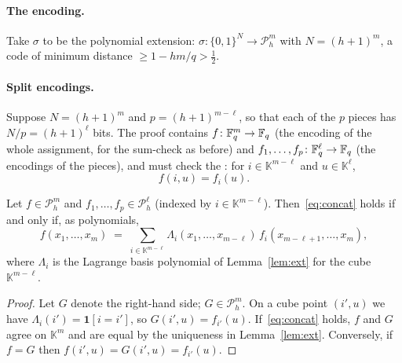 \paragraph{The encoding.}  Take $\sigma$ to be the polynomial extension: $\sigma\colon\{0,1\}^N\to\mathcal P^{m}_h$ with $N=(h+1)^m$, a code of minimum distance $\ge1-hm/q>\tfrac12$.

\paragraph{Split encodings.}  Suppose $N=(h+1)^m$ and $p=(h+1)^{m-\ell}$, so that each of the $p$ pieces has $N/p=(h+1)^\ell$ bits.  The proof contains $f\colon\mathbb{F}_q^m\to\mathbb{F}_q$ (the encoding of the whole assignment, for the sum-check as before)
and $f_1,\dots,f_p\colon\mathbb{F}_q^\ell\to\mathbb{F}_q$ (the encodings of the pieces), and must check the : for $i\in\mathbb K^{m-\ell}$ and $u\in\mathbb K^\ell$,
\begin{equation}\label{eq:concat}
  f(i,u)=f_i(u).
\end{equation}

\begin{lemma}[Concatenation]\label{lem:concat}
Let $f\in\mathcal P^m_h$ and $f_1,\dots,f_p\in\mathcal P^\ell_h$ (indexed by $i\in\mathbb K^{m-\ell}$).  Then~\eqref{eq:concat} holds if and only if, as polynomials,
\[
  f(x_1,\dots,x_m)\;=\;\sum_{i\in\mathbb K^{m-\ell}}\Lambda_i(x_1,\dots,x_{m-\ell})\,f_i(x_{m-\ell+1},\dots,x_m),
\]
where $\Lambda_i$ is the Lagrange basis polynomial of Lemma~\ref{lem:ext} for the cube $\mathbb K^{m-\ell}$.
\end{lemma}
\begin{proof}
Let $G$ denote the right-hand side; $G\in\mathcal P^m_h$.  On a cube point $(i',u)$ we have $\Lambda_i(i')=\mathbf 1[i=i']$, so $G(i',u)=f_{i'}(u)$.  If~\eqref{eq:concat} holds, $f$ and $G$ agree on $\mathbb K^m$ and are equal by the
uniqueness in Lemma~\ref{lem:ext}.  Conversely, if $f=G$ then $f(i',u)=G(i',u)=f_{i'}(u)$.
\end{proof}

